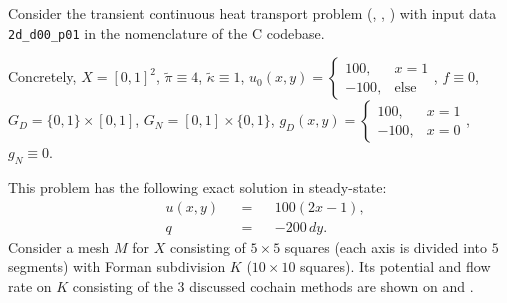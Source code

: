 \begin{example}
  \label{cmc/diffusion/continuous/transient/examples/2d_d00_p01-example}
  Consider the transient continuous heat transport problem
  (,
   ,
   )
  with input data \verb|2d_d00_p01| in the nomenclature of the C codebase.

  Concretely,
    $X = [0, 1]^2$,
    $\tilde{\pi} \equiv 4$,
    $\tilde{\kappa} \equiv 1$,
    $u_0(x, y) =
      \begin{cases}
        100, & x = 1 \\
        -100, & \text{else}
      \end{cases}$,
    $f \equiv 0$,
    $G_D = \{0, 1\} \times [0, 1]$,
    $G_N = [0, 1] \times \{0, 1\}$,
    $g_D(x, y) = 
      \begin{cases}
        100, & x = 1 \\
        -100, & x = 0
      \end{cases}$,
    $g_N \equiv 0$.

  This problem has the following exact solution in steady-state:
  \begin{subequations}
    \begin{alignat}{3}
      & u(x, y) && = && 100 (2 x - 1), \\
      & q && = && - 200\, d y.
    \end{alignat}
  \end{subequations}
  Consider a mesh $M$ for $X$ consisting of $5 \times 5$ squares (each axis is
  divided into $5$ segments) with Forman subdivision $K$
  ($10 \times 10$ squares).
  Its potential and flow rate on $K$ consisting of the $3$ discussed cochain
  methods are shown on
  and
  .
\end{example}
